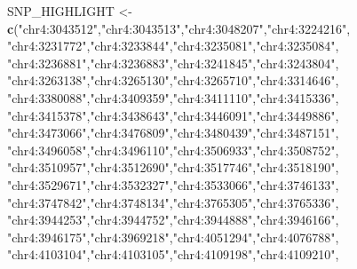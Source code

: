 \documentclass[
]{book}
\newenvironment{Shaded}{\begin{snugshade}}{\end{snugshade}}
\newcommand{\FunctionTok}[1]{\textcolor[rgb]{0.13,0.29,0.53}{\textbf{#1}}}
\newcommand{\NormalTok}[1]{#1}
\newcommand{\OtherTok}[1]{\textcolor[rgb]{0.56,0.35,0.01}{#1}}
\newcommand{\StringTok}[1]{\textcolor[rgb]{0.31,0.60,0.02}{#1}}
\begin{document}
\begin{Shaded}
\begin{Highlighting}[]
\NormalTok{SNP\_HIGHLIGHT }\OtherTok{\textless{}{-}} \FunctionTok{c}\NormalTok{(}\StringTok{"chr4:3043512"}\NormalTok{,}\StringTok{"chr4:3043513"}\NormalTok{,}\StringTok{"chr4:3048207"}\NormalTok{,}\StringTok{"chr4:3224216"}\NormalTok{,}
                   \StringTok{"chr4:3231772"}\NormalTok{,}\StringTok{"chr4:3233844"}\NormalTok{,}\StringTok{"chr4:3235081"}\NormalTok{,}\StringTok{"chr4:3235084"}\NormalTok{,}
                   \StringTok{"chr4:3236881"}\NormalTok{,}\StringTok{"chr4:3236883"}\NormalTok{,}\StringTok{"chr4:3241845"}\NormalTok{,}\StringTok{"chr4:3243804"}\NormalTok{,}
                   \StringTok{"chr4:3263138"}\NormalTok{,}\StringTok{"chr4:3265130"}\NormalTok{,}\StringTok{"chr4:3265710"}\NormalTok{,}\StringTok{"chr4:3314646"}\NormalTok{,}
                   \StringTok{"chr4:3380088"}\NormalTok{,}\StringTok{"chr4:3409359"}\NormalTok{,}\StringTok{"chr4:3411110"}\NormalTok{,}\StringTok{"chr4:3415336"}\NormalTok{,}
                   \StringTok{"chr4:3415378"}\NormalTok{,}\StringTok{"chr4:3438643"}\NormalTok{,}\StringTok{"chr4:3446091"}\NormalTok{,}\StringTok{"chr4:3449886"}\NormalTok{,}
                   \StringTok{"chr4:3473066"}\NormalTok{,}\StringTok{"chr4:3476809"}\NormalTok{,}\StringTok{"chr4:3480439"}\NormalTok{,}\StringTok{"chr4:3487151"}\NormalTok{,}
                   \StringTok{"chr4:3496058"}\NormalTok{,}\StringTok{"chr4:3496110"}\NormalTok{,}\StringTok{"chr4:3506933"}\NormalTok{,}\StringTok{"chr4:3508752"}\NormalTok{,}
                   \StringTok{"chr4:3510957"}\NormalTok{,}\StringTok{"chr4:3512690"}\NormalTok{,}\StringTok{"chr4:3517746"}\NormalTok{,}\StringTok{"chr4:3518190"}\NormalTok{,}
                   \StringTok{"chr4:3529671"}\NormalTok{,}\StringTok{"chr4:3532327"}\NormalTok{,}\StringTok{"chr4:3533066"}\NormalTok{,}\StringTok{"chr4:3746133"}\NormalTok{,}
                   \StringTok{"chr4:3747842"}\NormalTok{,}\StringTok{"chr4:3748134"}\NormalTok{,}\StringTok{"chr4:3765305"}\NormalTok{,}\StringTok{"chr4:3765336"}\NormalTok{,}
                   \StringTok{"chr4:3944253"}\NormalTok{,}\StringTok{"chr4:3944752"}\NormalTok{,}\StringTok{"chr4:3944888"}\NormalTok{,}\StringTok{"chr4:3946166"}\NormalTok{,}
                   \StringTok{"chr4:3946175"}\NormalTok{,}\StringTok{"chr4:3969218"}\NormalTok{,}\StringTok{"chr4:4051294"}\NormalTok{,}\StringTok{"chr4:4076788"}\NormalTok{,}
                   \StringTok{"chr4:4103104"}\NormalTok{,}\StringTok{"chr4:4103105"}\NormalTok{,}\StringTok{"chr4:4109198"}\NormalTok{,}\StringTok{"chr4:4109210"}\NormalTok{,}

\end{Highlighting}
\end{Shaded}
\end{document}
